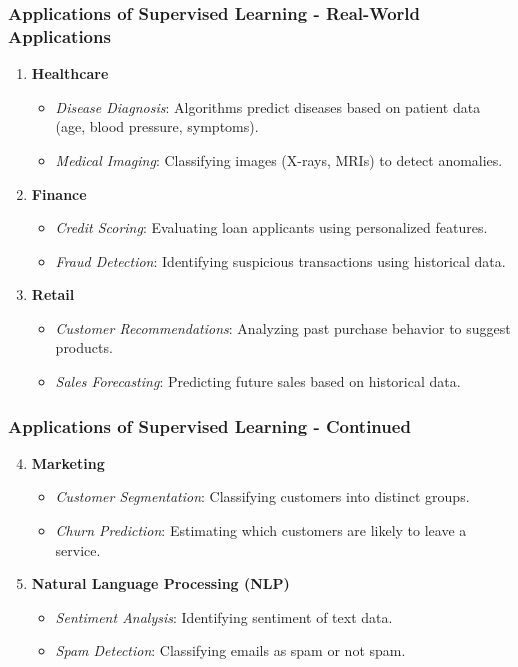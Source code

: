 \documentclass{beamer}
\begin{document}
\begin{frame}[fragile]
    \frametitle{Applications of Supervised Learning - Real-World Applications}
    \begin{enumerate}
        \item \textbf{Healthcare}
        \begin{itemize}
            \item \textit{Disease Diagnosis}:
            Algorithms predict diseases based on patient data (age, blood pressure, symptoms).
            \item \textit{Medical Imaging}:
            Classifying images (X-rays, MRIs) to detect anomalies.
        \end{itemize}
        
        \item \textbf{Finance}
        \begin{itemize}
            \item \textit{Credit Scoring}:
            Evaluating loan applicants using personalized features.
            \item \textit{Fraud Detection}:
            Identifying suspicious transactions using historical data.
        \end{itemize}
        
        \item \textbf{Retail}
        \begin{itemize}
            \item \textit{Customer Recommendations}:
            Analyzing past purchase behavior to suggest products.
            \item \textit{Sales Forecasting}:
            Predicting future sales based on historical data.
        \end{itemize}
    \end{enumerate}
\end{frame}

\begin{frame}[fragile]
    \frametitle{Applications of Supervised Learning - Continued}
    \begin{enumerate}
        \setcounter{enumi}{3}
        \item \textbf{Marketing}
        \begin{itemize}
            \item \textit{Customer Segmentation}:
            Classifying customers into distinct groups.
            \item \textit{Churn Prediction}:
            Estimating which customers are likely to leave a service.
        \end{itemize}

        \item \textbf{Natural Language Processing (NLP)}
        \begin{itemize}
            \item \textit{Sentiment Analysis}:
            Identifying sentiment of text data.
            \item \textit{Spam Detection}:
            Classifying emails as spam or not spam.
        \end{itemize}
    \end{enumerate}
\end{frame}
\end{document}
